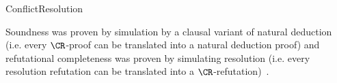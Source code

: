 \begin{entry}{ConflictResolution}
\begin{technicalities}
Soundness was proven by simulation by a clausal variant of natural deduction  (i.e. every $\CR$-proof can be translated into a natural deduction proof) and refutational completeness was proven by simulating resolution  (i.e. every resolution refutation can be translated into a $\CR$-refutation)~\cite{ConflictResolution}.
\end{technicalities}


\end{entry}
